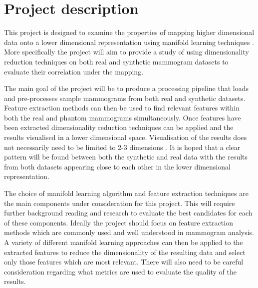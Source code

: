 \documentclass[11pt,fleqn,twoside]{article}
\begin{document}
\wordcount{}

\mmp

\setcounter{tocdepth}{3} %


\section{Project description}
This project is designed to examine the properties of mapping higher dimensional data onto a lower dimensional representation using manifold learning techniques \cite{cayton2005algorithms}. More specifically the project will aim to provide a study of using dimensionality reduction techniques on both real \cite{suckling1994mammographic} and synthetic\cite{bakic2002mammogram1, bakic2002mammogram2, bakic2003mammogram3} mammogram datasets to evaluate their correlation under the mapping.

The main goal of the project will be to produce a processing pipeline that loads and pre-processes sample mammograms from both real and synthetic datasets. Feature extraction methods can then be used to find relevant features within both the real and phantom mammograms simultaneously. Once features have been extracted dimensionality reduction techniques can be applied and the results visualised in a lower dimensional space. Visualisation of the results does not necessarily need to be limited to 2-3 dimensions \cite{bertini2011quality}. It is hoped that a clear pattern will be found between both the synthetic and real data with the results from both datasets appearing close to each other in the lower dimensional representation.

The choice of manifold learning algorithm and feature extraction techniques are the main components under consideration for this project. This will require further background reading and research to evaluate the best candidates for each of these components. Ideally the project should focus on feature extraction methods which are commonly used and well understood in mammogram analysis. A variety of different manifold learning approaches can then be applied to the extracted features to reduce the dimensionality of the resulting data and select only those features which are most relevant. There will also need to be careful consideration regarding what metrics are used to evaluate the quality of the results.
\end{document}
